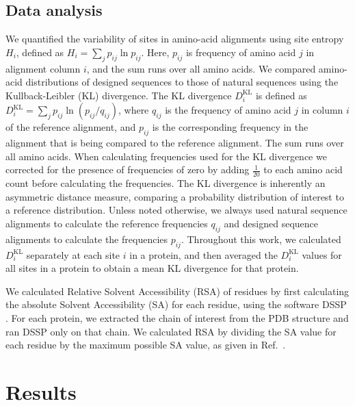 \documentclass[12pt]{article}
\begin{document}
\subsection{Data analysis}

We quantified the variability of sites in amino-acid alignments using site entropy $H_i$, defined as $H_i=\sum_{j}p_{ij}\ln p_{ij}$. Here, $p_{ij}$ is frequency of amino acid $j$ in alignment column $i$, and the sum runs over all amino acids. We compared amino-acid distributions of designed sequences to those of natural sequences using the Kullback-Leibler (KL) divergence. The KL divergence $D^\text{KL}_i$ is defined as $D^\text{KL}_i= \sum_j  p_{ij} \ln  (p_{ij}/q_{ij})$, where $q_{ij}$ is the frequency of amino acid $j$ in column $i$ of the reference alignment, and $p_{ij}$ is the corresponding frequency in the alignment that is being compared to the reference alignment. The sum runs over all amino acids.  When calculating frequencies used for the KL divergence we corrected for the presence of frequencies of zero by adding  $\frac{1}{20}$ to each amino acid count before calculating the frequencies. The KL divergence is inherently an asymmetric distance measure, comparing a probability distribution of interest to a reference distribution. Unless noted otherwise, we always used natural sequence alignments to calculate the reference frequencies $q_{ij}$ and designed sequence alignments to calculate the frequencies $p_{ij}$. Throughout this work, we calculated $D^\text{KL}_i$ separately at each site $i$ in a protein, and then averaged the $D^\text{KL}_i$ values for all sites in a protein to obtain a mean KL divergence for that protein. 

We calculated Relative Solvent Accessibility (RSA) of residues by first calculating the absolute Solvent Accessibility (SA) for each residue, using the software DSSP \cite{Kabsch1983}. For each protein, we extracted the chain of interest from the PDB structure and ran DSSP only on that chain. We calculated RSA by dividing the SA value for each residue by the maximum possible SA value, as given in Ref.\ \cite{Tien}. 

\section{Results}
\label{Results}
\end{document}
